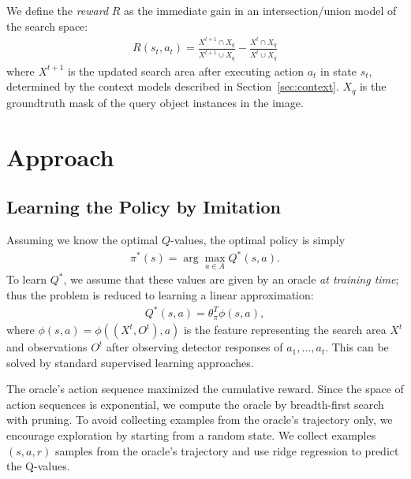 
We define the \textit{reward} $R$ as the immediate gain in an intersection/union model of the search space:
\begin{eqnarray}
\label{eq:imreward}
R(s_t,a_t) =  \frac{X^{t+1} \cap X_q}{X^{t+1} \cup X_q} - \frac{X^{t}\cap X_q}{X^{t} \cup X_q}
\end{eqnarray}
where $X^{t+1}$ is the updated search area after executing action $a_t$ in state $s_t$, determined by the context models described in Section~\ref{sec:context}. $X_q$ is the groundtruth mask of the query object instances in the image. 

\section{Approach}
\subsection{Learning the Policy by Imitation}
Assuming we know the optimal $Q$-values, the optimal policy is simply
\begin{eqnarray}
\label{eq:pi}
\pi^\ast(s) = \arg\max_{a\in A} Q^\ast(s,a).
\end{eqnarray}
To learn $Q^\ast$, we assume that these values are given by an oracle \emph{at training time}; thus the problem is reduced to learning
a linear approximation:
\begin{eqnarray}
\label{eq:qvalue}
Q^{\ast}(s,a) = \theta_\pi^T \phi(s,a),
\end{eqnarray}
where $\phi(s,a) = \phi((X^t, O^t),a)$ is the feature representing the search area $X^t$ and observations $O^t$ after observing detector responses of $a_1,...,a_t$. 
This can be solved by standard supervised learning approaches.

The oracle's action sequence maximized the cumulative reward. Since the space of action sequences is exponential, we compute the oracle by breadth-first search with pruning. To avoid collecting examples from the oracle's trajectory only, we encourage exploration by starting from a random state.
We collect examples $(s,a,r)$ samples from the oracle's trajectory and use ridge regression to predict the Q-values.

